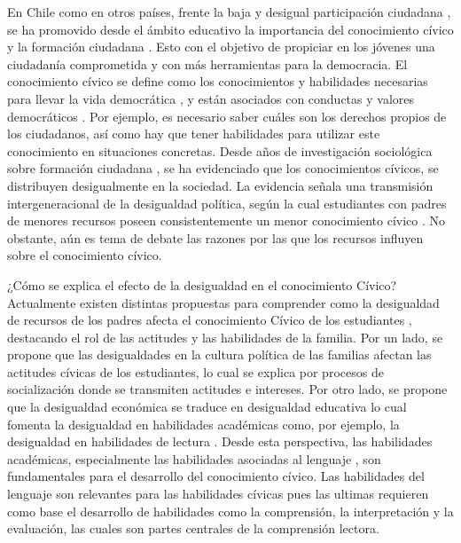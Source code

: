 \documentclass[12pt,twoside]{templates/facsothesis}
\begin{document}
En Chile como en otros países, frente la baja y desigual participación ciudadana \citep{janmaat_Civic_2013, lijphart_Unequal_1997}, se ha promovido desde el ámbito educativo la importancia del conocimiento cívico y la formación ciudadana \citep{keer_ciudadania_2015}. Esto con el objetivo de propiciar en los jóvenes una ciudadanía comprometida y con más herramientas para la democracia. El conocimiento cívico se define como los conocimientos y habilidades necesarias para llevar la vida democrática \citep{schulz_Initial_2010}, y están asociados con conductas y valores democráticos \citep{schulz_Initial_2010, galston_Civic_2007, miranda_Political_2018}. Por ejemplo, es necesario saber cuáles son los derechos propios de los ciudadanos, así como hay que tener habilidades para utilizar este conocimiento en situaciones concretas. Desde años de investigación sociológica sobre formación ciudadana \citep{torney_Crossnational_1979}, se ha evidenciado que los conocimientos cívicos, se distribuyen desigualmente en la sociedad. La evidencia señala una transmisión intergeneracional de la desigualdad política, según la cual estudiantes con padres de menores recursos poseen consistentemente un menor conocimiento cívico \citep{castillo_Social_2014, miranda_Political_2018, ferrans_Civic_2017, trevino_Influence_2017}. No obstante, aún es tema de debate las razones por las que los recursos influyen sobre el conocimiento cívico.

¿Cómo se explica el efecto de la desigualdad en el conocimiento Cívico? Actualmente existen distintas propuestas para comprender como la desigualdad de recursos de los padres afecta el conocimiento Cívico de los estudiantes \citep{miranda_Political_2018}, destacando el rol de las actitudes y las habilidades de la familia. Por un lado, se propone que las desigualdades en la cultura política de las familias afectan las actitudes cívicas de los estudiantes, lo cual se explica por procesos de socialización donde se transmiten actitudes e intereses. Por otro lado, se propone que la desigualdad económica se traduce en desigualdad educativa lo cual fomenta la desigualdad en habilidades académicas como, por ejemplo, la desigualdad en habilidades de lectura \citep{brady_Political_2015}. Desde esta perspectiva, las habilidades académicas, especialmente las habilidades asociadas al lenguaje \citep{torney-purta_estudio_2015}, son fundamentales para el desarrollo del conocimiento cívico. Las habilidades del lenguaje son relevantes para las habilidades cívicas pues las ultimas requieren como base el desarrollo de habilidades como la comprensión, la interpretación y la evaluación, las cuales son partes centrales de la comprensión lectora.
\end{document}
